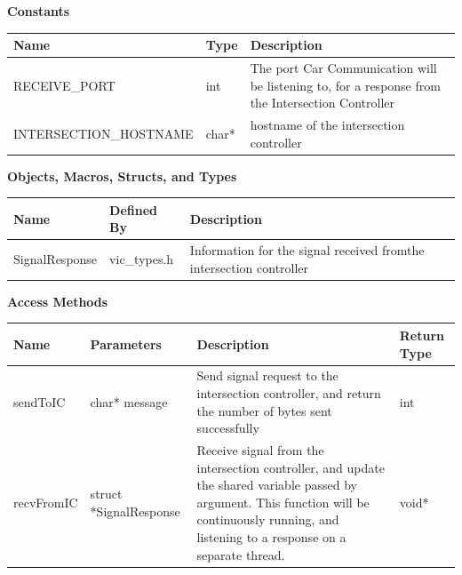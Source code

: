 \documentclass [10pt]{article}
\begin{document}
\textbf{Constants}\\ 
\begin{longtable}{| p{ }  p{ } p{}|} \hline

\textbf{Name} & \textbf{Type} & \textbf{Description} \\ \hline
\rowcolor{tableCell}  RECEIVE\_PORT & int & The port Car Communication will be listening to, for a response from the Intersection Controller\\ \hline
INTERSECTION\_HOSTNAME & char* & hostname of the intersection controller \\ \hline



\end{longtable}


\textbf{Objects, Macros, Structs, and Types}\\ 
\begin{longtable}{ |p{ }  p{ } p{}|} \hline

 \textbf{Name} & \textbf{Defined By} & \textbf{Description} \\ \hline


\rowcolor{tableCell} SignalResponse & vic\_types.h &  Information for the signal received fromthe intersection controller \\ \hline



\end{longtable}



\textbf{Access Methods} \\ 

\begin{longtable}{| p{ }  p{ } p{} p{}|} \hline

 \textbf{Name} & \textbf{Parameters} & \textbf{Description} &\textbf{Return Type} \\ \hline
\rowcolor{tableCell} sendToIC & char* message & Send signal request to the intersection controller,  and return the number of bytes sent successfully & int \\ \hline
 recvFromIC & struct *SignalResponse & Receive signal from the intersection controller, and update the shared variable passed by argument. This function will be continuously running, and listening to a response on a separate thread. &  void* \\ \hline

\end{longtable}
\end{document}
